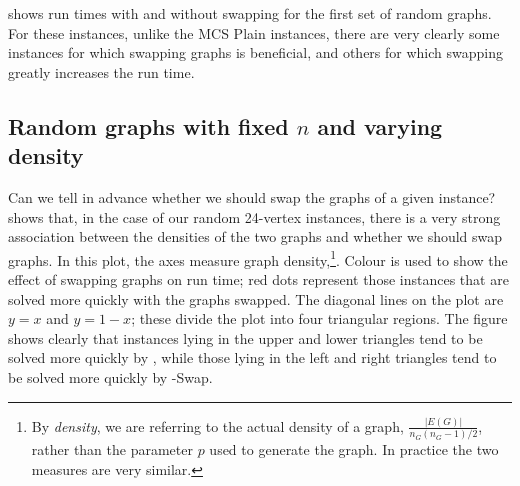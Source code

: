  shows run times with and without swapping
for the first set of random graphs.  For these instances, unlike the MCS Plain instances,
there are very clearly some instances for which swapping graphs is beneficial, and others
for which swapping greatly increases the run time.

\subsection{Random graphs with fixed $n$ and varying density}

Can we tell in advance whether we should swap the graphs of a given instance?
 shows that, in the case of our
random 24-vertex instances, there is a very strong association between the densities
of the two graphs and whether we should swap graphs.  In this plot, the axes
measure graph density,\footnote{By \emph{density}, we are referring to the actual density of a graph,
$\frac{|E(G)|}{n_G(n_G-1)/2}$, rather than the parameter $p$ used to generate
the graph. In practice the two measures are very similar.}. Colour is used to show
the effect of swapping graphs on run time; red dots represent those instances
that are solved more quickly with the graphs swapped.  The diagonal lines on the plot
are $y=x$ and $y=1-x$; these divide the plot into four triangular regions.
The figure shows clearly that instances lying
in the upper and lower triangles tend to be solved more quickly by \McSplit, while
those lying in the left and right triangles tend to be solved more
quickly by \McSplit-Swap.

